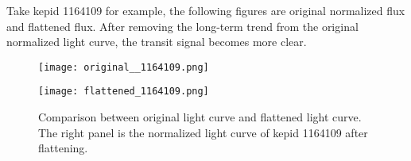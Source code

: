       \begin{table}[!htp]
        \centering
        \centering
        \caption[Parameter values chosen in the LightKurve flatten method.]
          {Parameter values chosen in the LightKurve flatten method. The detailed 
          descriptions of these parameters can be found on the lightkurve official 
          website.}
        \label{table: params_1162345}
      \end{table}

      Take kepid 1164109 for example, the following figures are original normalized flux 
      and flattened flux. After removing the long-term trend from the original normalized 
      light curve, the transit signal becomes more clear. 

      \begin{figure}[!ht]  
        \begin{center}
        \begin{minipage}{0.45\textwidth}
          \begin{center} 
              \texttt{[image: original\_\_1164109.png]}
          \end{center}
        \end{minipage}
        \begin{minipage}{0.45\textwidth}
          \begin{center} 
              \texttt{[image: flattened\_1164109.png]}
          \end{center}
        \end{minipage}
      \end{center}
      \begin{center}
        \caption[Comparison between original light curve and flattened light curve.]
          {Comparison between original light curve and flattened light curve. The right 
          panel is the normalized light curve of kepid 1164109 after flattening. }
        \label{fig: 1164109_comparison} 
        \end{center} 
      \end{figure}

